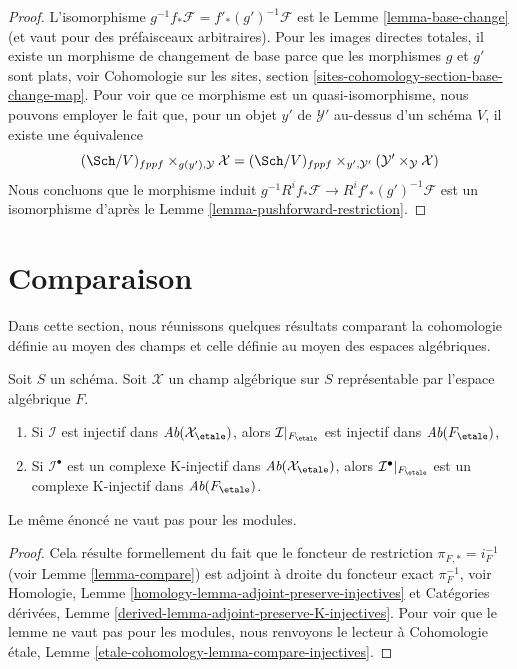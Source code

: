 \begin{proof}
L'isomorphisme $g^{-1}f_*\mathcal{F} = f'_*(g')^{-1}\mathcal{F}$ est le
Lemme \ref{lemma-base-change} (et vaut pour des préfaisceaux arbitraires).
Pour les images directes totales, il existe un morphisme de changement de base parce que les
morphismes $g$ et $g'$ sont plats, voir
Cohomologie sur les sites, section \ref{sites-cohomology-section-base-change-map}.
Pour voir que ce morphisme est un quasi-isomorphisme, nous pouvons employer le fait que, pour
un objet $y'$ de $\mathcal{Y}'$ au-dessus d'un schéma $V$, il existe une équivalence
$$
(\Sch/V)_{fppf} \times_{g(y'), \mathcal{Y}} \mathcal{X}
=
(\Sch/V)_{fppf} \times_{y', \mathcal{Y}'}
(\mathcal{Y}' \times_\mathcal{Y} \mathcal{X})
$$
Nous concluons que le morphisme induit
$g^{-1}R^if_*\mathcal{F} \to R^if'_*(g')^{-1}\mathcal{F}$
est un isomorphisme d'après le
Lemme \ref{lemma-pushforward-restriction}.
\end{proof}












\section{Comparaison}
\label{section-compare}

\noindent
Dans cette section, nous réunissons quelques résultats comparant la cohomologie définie
au moyen des champs et celle définie au moyen des espaces algébriques.

\begin{lemma}
\label{lemma-compare-injectives}
Soit $S$ un schéma. Soit $\mathcal{X}$ un champ algébrique sur $S$
représentable par l'espace algébrique $F$.
\begin{enumerate}
\item Si $\mathcal{I}$ est injectif dans $\textit{Ab}(\mathcal{X}_\etale)$, alors
$\mathcal{I}|_{F_\etale}$ est injectif dans $\textit{Ab}(F_\etale)$,
\item Si $\mathcal{I}^\bullet$ est un complexe K-injectif dans
$\textit{Ab}(\mathcal{X}_\etale)$, alors $\mathcal{I}^\bullet|_{F_\etale}$
est un complexe K-injectif dans $\textit{Ab}(F_\etale)$.
\end{enumerate}
Le même énoncé ne vaut pas pour les modules.
\end{lemma}

\begin{proof}
Cela résulte formellement du fait que le foncteur de restriction
$\pi_{F, *} = i_F^{-1}$ (voir Lemme \ref{lemma-compare})
est adjoint à droite du foncteur exact $\pi_F^{-1}$, voir
Homologie, Lemme \ref{homology-lemma-adjoint-preserve-injectives} et
Catégories dérivées, Lemme \ref{derived-lemma-adjoint-preserve-K-injectives}.
Pour voir que le lemme ne vaut pas pour les modules, nous renvoyons le
lecteur à Cohomologie \'etale, Lemme
\ref{etale-cohomology-lemma-compare-injectives}.
\end{proof}

